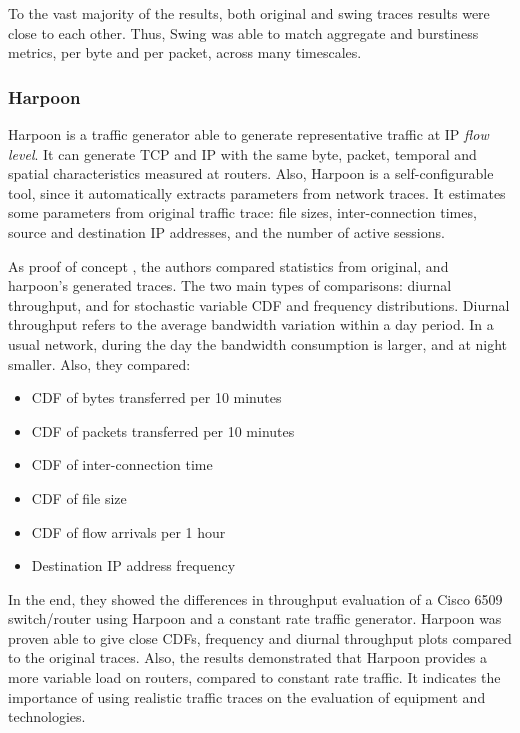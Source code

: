 To the vast majority of the results, both original and swing traces results were close to each other. Thus,  Swing was able to match aggregate and burstiness metrics, per byte and per packet, across many timescales.  


\subsubsection{Harpoon}

Harpoon\cite{harpoon-validation}\cite{harpoon-paper} is a traffic generator able to generate representative traffic at IP \textit{flow level}. It can generate TCP and IP with the same byte, packet, temporal and spatial characteristics measured at routers. Also, Harpoon is a self-configurable tool, since it automatically extracts parameters from network traces. It estimates some parameters from original traffic trace: file sizes, inter-connection times, source and destination IP addresses, and the number of active sessions. 

As proof of concept \cite{ harpoon-validation}, the authors compared statistics from original, and harpoon's generated traces. The two main types of comparisons: diurnal throughput, and for stochastic variable CDF and frequency distributions. Diurnal throughput refers to the average bandwidth variation within a day period.  In a usual network, during the day the bandwidth consumption is larger, and at night smaller. Also, they compared:

\begin{itemize}
	\item CDF of bytes transferred per 10 minutes
	\item CDF of packets transferred per 10 minutes
	\item CDF of inter-connection time
	\item CDF of file size
	\item CDF of flow arrivals per 1 hour
	\item Destination IP address frequency
\end{itemize}

In the end, they showed the differences in throughput evaluation of a Cisco 6509 switch/router using Harpoon and a constant rate traffic generator.  
Harpoon was proven able to give close CDFs, frequency and diurnal throughput plots compared to the original traces. Also, the results demonstrated that Harpoon provides a more variable load on routers, compared to constant rate traffic. It indicates the importance of using realistic traffic traces on the evaluation of equipment and technologies. 

